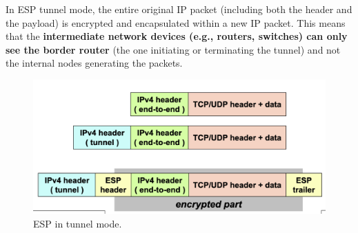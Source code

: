 \begin{tcolorbox}[colback=red!10!white, colframe=red!70!black, coltitle=white, title=Be aware]
    In ESP tunnel mode, the entire original IP packet (including both the header and the payload) is encrypted and encapsulated within a new IP packet. This means that the \textbf{intermediate network devices (e.g., routers, switches) can only see the border router} (the one initiating or terminating the tunnel) and not the internal nodes generating the packets.
\end{tcolorbox}

\begin{figure}[H]
    \includegraphics[width=\linewidth]{Images/NetSec/esp_tunnel_mode.png}
    \caption{ESP in tunnel mode.}
\end{figure}


